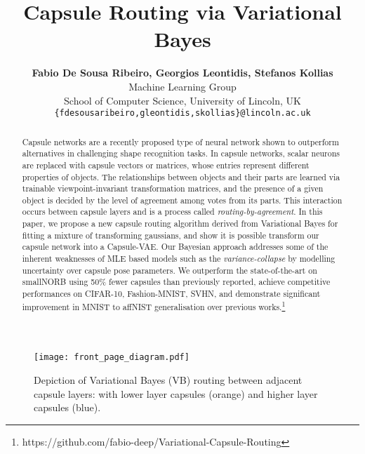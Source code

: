 \documentclass[letterpaper]{article} \usepackage{aaai20}  \usepackage{times}  \usepackage{helvet} \usepackage{courier}  \usepackage[hyphens]{url}  \usepackage{graphicx} \urlstyle{rm} \def\UrlFont{\rm}  \usepackage{graphicx}  \frenchspacing  \setlength{\pdfpagewidth}{8.5in}  \setlength{\pdfpageheight}{11in}  \nocopyright
\title{Capsule Routing via Variational Bayes}
\author{\Large \textbf{Fabio De Sousa Ribeiro, Georgios Leontidis, Stefanos Kollias} \\ 
Machine Learning Group \\ 
School of Computer Science, University of Lincoln, UK\\
\texttt{\{fdesousaribeiro,gleontidis,skollias\}@lincoln.ac.uk}}
\begin{document}
\maketitle
\begin{abstract}
Capsule networks are a recently proposed type of neural network shown to outperform alternatives in challenging shape recognition tasks. In capsule networks, scalar neurons are replaced with capsule vectors or matrices, whose entries represent different properties of objects. The relationships between objects and their parts are learned via trainable viewpoint-invariant transformation matrices, and the presence of a given object is decided by the level of agreement among votes from its parts. This interaction occurs between capsule layers and is a process called \textit{routing-by-agreement}. In this paper, we propose a new capsule routing algorithm derived from Variational Bayes for fitting a mixture of transforming gaussians, and show it is possible transform our capsule network into a Capsule-VAE. Our Bayesian approach addresses some of the inherent weaknesses of MLE based models such as the \textit{variance-collapse} by modelling uncertainty over capsule pose parameters. We outperform the state-of-the-art on smallNORB using 50\% fewer capsules than previously reported, achieve competitive performances on CIFAR-10, Fashion-MNIST, SVHN, and demonstrate significant improvement in MNIST to affNIST generalisation over previous works.\footnote{https://github.com/fabio-deep/Variational-Capsule-Routing}
\end{abstract}
\begin{figure}[t]
    \centering
    \texttt{[image: front\_page\_diagram.pdf]}
 \caption{Depiction of Variational Bayes (VB) routing between adjacent capsule layers: with lower layer capsules  (orange) and higher layer capsules  (blue).}
\label{plots}
\end{figure}
\end{document}
